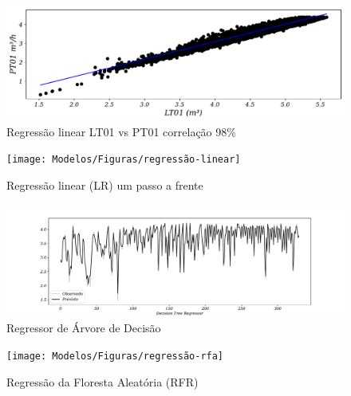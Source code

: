 \begin{figure}[H]
	\centering
	\caption{Regressão linear LT01 vs PT01 correlação 98\%}
	\label{fig:lr-lt01-m3}
	\includegraphics[width=0.82\linewidth]{"Modelos/Figuras/LR LT01 (m³)"}
	
\end{figure}





\begin{figure}[H]
	\centering
	\caption{Regressão linear (LR) um passo a frente}
	\label{fig:1-regressao-linear}
	\texttt{[image: Modelos/Figuras/regressão-linear]}
	
\end{figure}




\begin{figure}[H]
	\centering
	\caption{Regressor de \'Arvore de Decis\~ao }\label{fig:decision-tree-regressor}
	\includegraphics[width=1\linewidth]{Apendices/Figuras/modelagem-24h/Decision-Tree-Regressor}
	
\end{figure}



\begin{figure}[H]
	\centering
	\caption{Regressão da Floresta Aleatória (RFR)}
	\label{fig:1-regressao-rfa}
	\texttt{[image: Modelos/Figuras/regressão-rfa]}
	
\end{figure}





